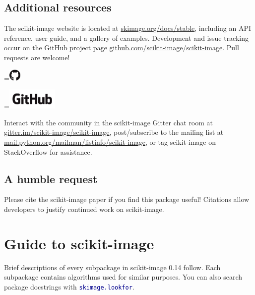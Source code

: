 \documentclass[nohyper, %
               ]{tufte-handout}
\newcommand{\release}{0.14\xspace} %
\DeclareRobustCommand{\ski}{scikit-image\xspace}
\newcommand*{\vcenteredhbox}[1]{\begingroup
\setbox0=\hbox{#1}\parbox{\wd0}{\box0}\endgroup}
\begin{document}
\subsection{Additional resources} %
  \label{sub:additional_resources}
  The \ski website is located at \url{skimage.org/docs/stable}, including an API reference, user guide, and a gallery of examples. Development and issue tracking occur on the GitHub project page \url{github.com/scikit-image/scikit-image}. Pull requests are welcome!\\\medskip
  \begin{marginfigure}[-1.7cm]%
    \centering%
    \begingroup
      \vcenteredhbox{\includegraphics[height=0.59cm]{GitHub-Mark-Large.png}}%
      \vcenteredhbox{\includegraphics[height=1cm]{GitHub-Logo.png}}%
    \endgroup
    \label{fig:GitHub}%
  \end{marginfigure}%
  \noindent
  Interact with the community in the \ski Gitter chat room at \url{gitter.im/scikit-image/scikit-image}, post/subscribe to the mailing list at \url{mail.python.org/mailman/listinfo/scikit-image}, or tag scikit-image on StackOverflow for assistance.

\subsection{A humble request} %
  \label{sub:a_humble_request}
  Please cite the \ski paper\cite{van2014scikit} if you find this package useful! Citations allow developers to justify continued work on \ski.

\newpage%
\section{Guide to \ski} %
  \label{sec:guide}
  Brief descriptions of every subpackage in \ski \release follow. Each subpackage contains algorithms used for similar purposes. You can also search package docstrings with \textcolor{DarkBlue}{\texttt{skimage.lookfor}}.\\
\end{document}
